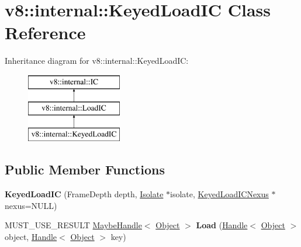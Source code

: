 \hypertarget{classv8_1_1internal_1_1_keyed_load_i_c}{}\section{v8\+:\+:internal\+:\+:Keyed\+Load\+IC Class Reference}
\label{classv8_1_1internal_1_1_keyed_load_i_c}
Inheritance diagram for v8\+:\+:internal\+:\+:Keyed\+Load\+IC\+:\begin{figure}[H]
\begin{center}
\leavevmode
\includegraphics[height=3.000000cm]{classv8_1_1internal_1_1_keyed_load_i_c}
\end{center}
\end{figure}
\subsection*{Public Member Functions}
\begin{DoxyCompactItemize}
\item 
{\bfseries Keyed\+Load\+IC} (Frame\+Depth depth, \hyperlink{classv8_1_1internal_1_1_isolate}{Isolate} $\ast$isolate, \hyperlink{classv8_1_1internal_1_1_keyed_load_i_c_nexus}{Keyed\+Load\+I\+C\+Nexus} $\ast$nexus=N\+U\+LL)\hypertarget{classv8_1_1internal_1_1_keyed_load_i_c_a1eae387092ac7f63f60621a6d7a7be05}{}\label{classv8_1_1internal_1_1_keyed_load_i_c_a1eae387092ac7f63f60621a6d7a7be05}

\item 
M\+U\+S\+T\+\_\+\+U\+S\+E\+\_\+\+R\+E\+S\+U\+LT \hyperlink{classv8_1_1internal_1_1_maybe_handle}{Maybe\+Handle}$<$ \hyperlink{classv8_1_1internal_1_1_object}{Object} $>$ {\bfseries Load} (\hyperlink{classv8_1_1internal_1_1_handle}{Handle}$<$ \hyperlink{classv8_1_1internal_1_1_object}{Object} $>$ object, \hyperlink{classv8_1_1internal_1_1_handle}{Handle}$<$ \hyperlink{classv8_1_1internal_1_1_object}{Object} $>$ key)\hypertarget{classv8_1_1internal_1_1_keyed_load_i_c_a0fb4a0354f4a4be12080a71e9560a676}{}\label{classv8_1_1internal_1_1_keyed_load_i_c_a0fb4a0354f4a4be12080a71e9560a676}

\end{DoxyCompactItemize}
